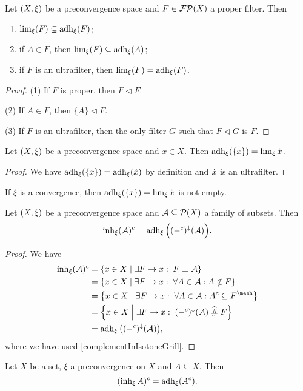 \begin{lemma} \label{adherenceLimitFilter}
Let $\sSet{X,\xi}$ be a preconvergence space and $F\in \operatorname{\mathcal{FP}}(X)$ a proper filter. Then
\begin{enumerate}
\item $\lim_\xi(F) \subseteq \operatorname{adh}_\xi(F)$;
\item if $A\in F$, then $\lim_\xi(F)\subseteq \operatorname{adh}_\xi(A)$;
\item if $F$ is an ultrafilter, then $\lim_\xi(F) = \operatorname{adh}_\xi(F)$.
\end{enumerate}
\end{lemma}
\begin{proof}
(1) If $F$ is proper, then $F\lhd F$.

(2) If $A\in F$, then $\{A\}\lhd F$.

(3) If $F$ is an ultrafilter, then the only filter $G$ such that $F\lhd G$ is $F$.
\end{proof}
\begin{corollary} \label{singletonAdherence}
Let $\sSet{X,\xi}$ be a preconvergence space and $x\in X$. Then $\operatorname{adh}_\xi(\{x\}) = \lim_\xi \dot{x}$.
\end{corollary}
\begin{proof}
We have $\operatorname{adh}_\xi(\{x\}) = \operatorname{adh}_\xi(\dot{x})$ by definition and $\dot{x}$ is an ultrafilter.
\end{proof}
If $\xi$ is a convergence, then $\operatorname{adh}_\xi(\{x\}) = \lim_\xi \dot{x}$ is not empty.

\begin{proposition} \label{inherenceComplementAdherence}
Let $\sSet{X,\xi}$ be a preconvergence space and $\mathcal{A}\subseteq \operatorname{\mathcal{P}}(X)$ a family of subsets. Then
\[ \operatorname{inh}_\xi(\mathcal{A})^c = \operatorname{adh}_\xi\Big((-^c)^{\downarrow}(\mathcal{A})\Big). \]
\end{proposition}
\begin{proof}
We have
\begin{align*}
\inh_\xi(\mathcal{A})^c &= \setbuilder{x\in X}{\exists F\to x: \; F\perp\mathcal{A}} \\
&= \setbuilder{x\in X}{\exists F\to x: \;\forall A\in\mathcal{A}: A\notin F} \\
&= \setbuilder{x\in X}{\exists F\to x: \; \forall A\in\mathcal{A}: A^c\subseteq F^\mesh} \\
&= \setbuilder{x\in X}{\exists F\to x: \; (-^c)^{\imf}(\mathcal{A}) \amesh F} \\
&= \adh_\xi\big((-^c)^{\imf}(\mathcal{A})\big),
\end{align*}
where we have used \ref{complementInIsotoneGrill}.
\end{proof}
\begin{corollary} \label{principalInherenceComplementAdherence}
Let $X$ be a set, $\xi$ a preconvergence on $X$ and $A \subseteq X$. Then
\[ (\operatorname{inh}_\xi A)^c = \operatorname{adh}_\xi (A^c). \]
\end{corollary}

